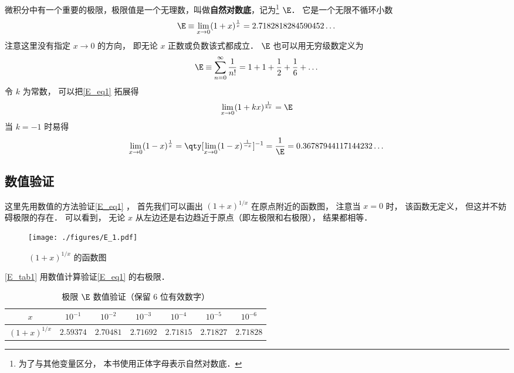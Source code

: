 
微积分中有一个重要的极限，极限值是一个无理数，叫做\textbf{自然对数底}，记为\footnote{为了与其他变量区分， 本书使用正体字母表示自然对数底．} $\E$． 它是一个无限不循环小数
\begin{equation}\label{E_eq1}
\E \equiv \lim_{x \to 0} (1 + x)^{\frac{1}{x}} = 2.7182818284590452\dots
\end{equation}
注意这里没有指定 $x\to 0$ 的方向， 即无论 $x$ 正数或负数该式都成立． $\E$ 也可以用无穷级数定义为
\begin{equation}\label{E_eq2}
\E \equiv \sum_{n=0}^\infty \frac{1}{n!} = 1 + 1 + \frac{1}{2} + \frac{1}{6} + \dots
\end{equation}
令 $k$ 为常数， 可以把\autoref{E_eq1} 拓展得
\begin{equation}
\lim_{x \to 0} (1 + kx)^{\frac{1}{kx}} = \E
\end{equation}
当 $k = -1$ 时易得
\begin{equation}\label{E_eq3}
\lim_{x \to 0} (1 - x)^{\frac{1}{x}} = \qty[\lim_{x \to 0} (1 - x)^{\frac{1}{-x}}]^{-1} = \frac{1}{\E} = 0.36787944117144232\dots
\end{equation}

\subsection{数值验证}
这里先用数值的方法验证\autoref{E_eq1} ， 首先我们可以画出 $(1+x)^{1/x}$ 在原点附近的函数图， 注意当 $x = 0$ 时， 该函数无定义， 但这并不妨碍极限的存在． 可以看到， 无论 $x$ 从左边还是右边趋近于原点（即左极限和右极限）， 结果都相等．
\begin{figure}[ht]
\centering
\texttt{[image: ./figures/E\_1.pdf]}
\caption{$(1+x)^{1/x}$ 的函数图} \label{E_fig1}
\end{figure}

\autoref{E_tab1} 用数值计算验证\autoref{E_eq1} 的右极限．
\begin{table}[ht]
\centering
\caption{极限 $\E$ 数值验证（保留 6 位有效数字）}\label{E_tab1}
\begin{tabular}{|c|c|c|c|c|c|c|}
\hline
$x$ & $10^{-1}$ & $10^{-2}$ & $10^{-3}$ & $10^{-4}$ & $10^{-5}$ & $10^{-6}$ \\
\hline
$(1 + x)^{1/x}$ & $2.59374$ & $2.70481$ & $2.71692$ & $2.71815$ & $2.71827$ & $2.71828$ \\
\hline
\end{tabular}
\end{table}

